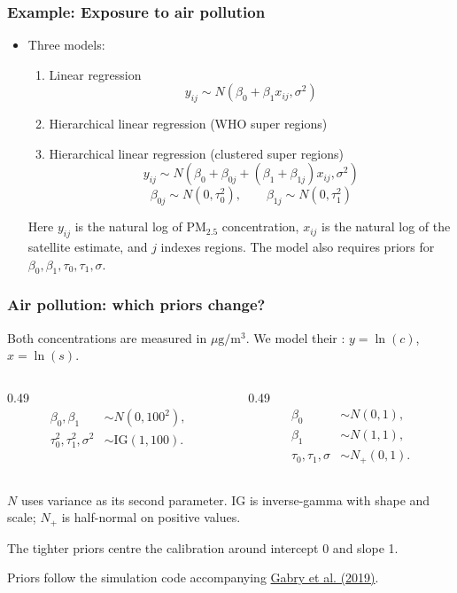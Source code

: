 \documentclass[10pt]{beamer}
\begin{document}
\begin{frame}

\frametitle{Example: Exposure to air pollution}

  \begin{itemize}
  \item Three models:
  \begin{enumerate}
  \item Linear regression
  \[
  y_{ij} \sim N(\beta_0 + \beta_1 x_{ij}, \sigma^2)
  \]
  \item Hierarchical linear regression (WHO super regions)
  \item Hierarchical linear regression (clustered super regions)
  \[
  y_{ij} \sim N(\beta_0 + \beta_{0j} + (\beta_1 + \beta_{1j}) x_{ij}, \sigma^2)
  \]
  \[
  \beta_{0j}\sim N(0,\tau_0^2),\qquad \beta_{1j}\sim N(0,\tau_1^2)
  \]
  \end{enumerate}
  Here $y_{ij}$ is the natural log of $\text{PM}_{2.5}$ concentration,
  $x_{ij}$ is the natural log of the satellite estimate, and $j$ indexes regions.
  The model also requires priors
  for $\beta_0,\beta_1,\tau_0,\tau_1,\sigma$.
  \end{itemize}
\end{frame}


\begin{frame}

\frametitle{Air pollution: which priors change?}

  Both concentrations are measured in $\mu\mathrm{g}/\mathrm{m}^3$.
  We model their : $y=\ln(c)$, $x=\ln(s)$.

  \begin{columns}[T,onlytextwidth]
    \begin{column}{0.49\textwidth}
      \begin{align*}
        \beta_0,\beta_1&\sim N(0,100^2),\\
        \tau_0^2,\tau_1^2,\sigma^2&\sim\mathrm{IG}(1,100).
      \end{align*}
    \end{column}
    \begin{column}{0.49\textwidth}
      \begin{align*}
        \beta_0&\sim N(0,1),\\
        \beta_1&\sim N(1,1),\\
        \tau_0,\tau_1,\sigma&\sim N_+(0,1).
      \end{align*}
    \end{column}
  \end{columns}

  {\small $N$ uses variance as its second parameter.
  IG is inverse-gamma with shape and scale; $N_+$ is half-normal on positive values.}

  The tighter priors centre the calibration around intercept 0 and slope 1.

  {\scriptsize Priors follow the simulation code accompanying
  \href{https://github.com/jgabry/bayes-vis-paper}{Gabry et al. (2019)}.}
\end{frame}
\end{document}
